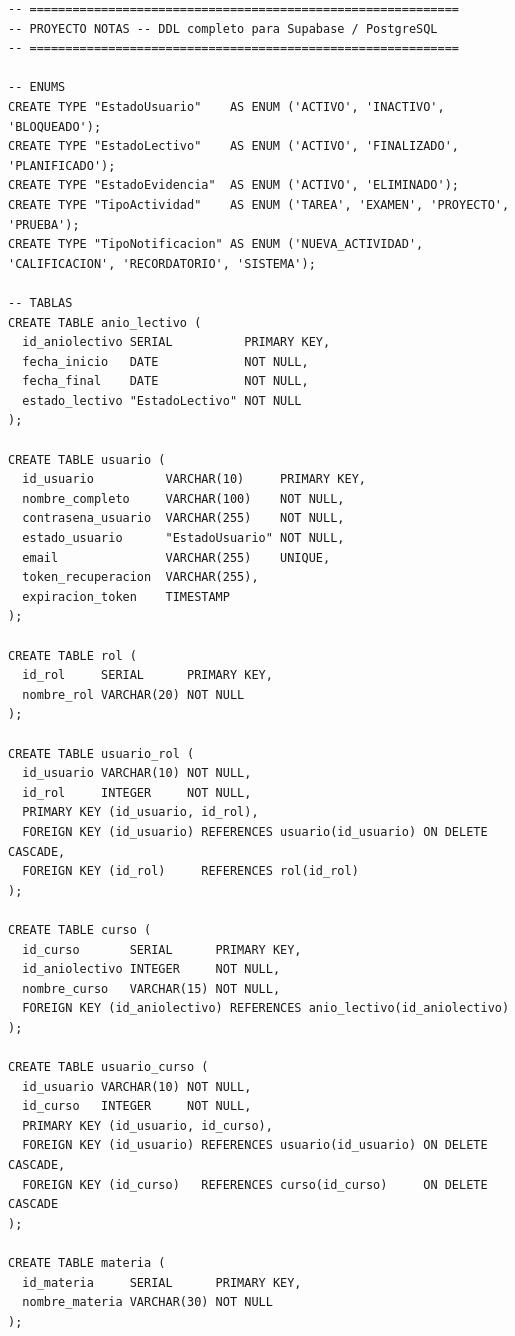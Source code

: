 \documentclass[12pt, a4paper]{article}
\begin{document}
\begin{lstlisting}[style=sql, caption={DDL completo --- estructura de tablas y ENUMs.}]
-- ============================================================
-- PROYECTO NOTAS -- DDL completo para Supabase / PostgreSQL
-- ============================================================

-- ENUMS
CREATE TYPE "EstadoUsuario"    AS ENUM ('ACTIVO', 'INACTIVO', 'BLOQUEADO');
CREATE TYPE "EstadoLectivo"    AS ENUM ('ACTIVO', 'FINALIZADO', 'PLANIFICADO');
CREATE TYPE "EstadoEvidencia"  AS ENUM ('ACTIVO', 'ELIMINADO');
CREATE TYPE "TipoActividad"    AS ENUM ('TAREA', 'EXAMEN', 'PROYECTO', 'PRUEBA');
CREATE TYPE "TipoNotificacion" AS ENUM ('NUEVA_ACTIVIDAD', 'CALIFICACION', 'RECORDATORIO', 'SISTEMA');

-- TABLAS
CREATE TABLE anio_lectivo (
  id_aniolectivo SERIAL          PRIMARY KEY,
  fecha_inicio   DATE            NOT NULL,
  fecha_final    DATE            NOT NULL,
  estado_lectivo "EstadoLectivo" NOT NULL
);

CREATE TABLE usuario (
  id_usuario          VARCHAR(10)     PRIMARY KEY,
  nombre_completo     VARCHAR(100)    NOT NULL,
  contrasena_usuario  VARCHAR(255)    NOT NULL,
  estado_usuario      "EstadoUsuario" NOT NULL,
  email               VARCHAR(255)    UNIQUE,
  token_recuperacion  VARCHAR(255),
  expiracion_token    TIMESTAMP
);

CREATE TABLE rol (
  id_rol     SERIAL      PRIMARY KEY,
  nombre_rol VARCHAR(20) NOT NULL
);

CREATE TABLE usuario_rol (
  id_usuario VARCHAR(10) NOT NULL,
  id_rol     INTEGER     NOT NULL,
  PRIMARY KEY (id_usuario, id_rol),
  FOREIGN KEY (id_usuario) REFERENCES usuario(id_usuario) ON DELETE CASCADE,
  FOREIGN KEY (id_rol)     REFERENCES rol(id_rol)
);

CREATE TABLE curso (
  id_curso       SERIAL      PRIMARY KEY,
  id_aniolectivo INTEGER     NOT NULL,
  nombre_curso   VARCHAR(15) NOT NULL,
  FOREIGN KEY (id_aniolectivo) REFERENCES anio_lectivo(id_aniolectivo)
);

CREATE TABLE usuario_curso (
  id_usuario VARCHAR(10) NOT NULL,
  id_curso   INTEGER     NOT NULL,
  PRIMARY KEY (id_usuario, id_curso),
  FOREIGN KEY (id_usuario) REFERENCES usuario(id_usuario) ON DELETE CASCADE,
  FOREIGN KEY (id_curso)   REFERENCES curso(id_curso)     ON DELETE CASCADE
);

CREATE TABLE materia (
  id_materia     SERIAL      PRIMARY KEY,
  nombre_materia VARCHAR(30) NOT NULL
);


\end{lstlisting}
\end{document}

